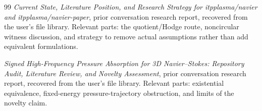 \documentclass[11pt,a4paper]{article}
\theoremstyle{definition}
\begin{document}
\begin{thebibliography}{99}
\emph{Current State, Literature Position, and Research Strategy for itpplasma/navier and itpplasma/navier-paper}, prior conversation research report, recovered from the user's file library. Relevant parts: the quotient/Hodge route, noncircular witness discussion, and strategy to remove actual assumptions rather than add equivalent formulations.

\emph{Signed High-Frequency Pressure Absorption for 3D Navier--Stokes: Repository Audit, Literature Review, and Novelty Assessment}, prior conversation research report, recovered from the user's file library. Relevant parts: existential equivalence, fixed-energy pressure-trajectory obstruction, and limits of the novelty claim.

\end{thebibliography}
\end{document}
